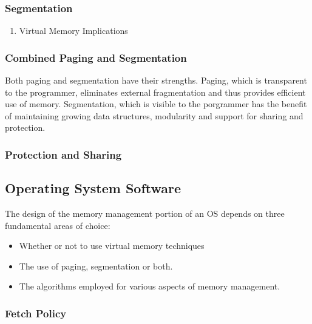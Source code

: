 \documentclass[11pt]{article}
\begin{document}
\subsubsection{Segmentation}
\label{sec:orgheadline35}

\begin{enumerate}
\item Virtual Memory Implications
\label{sec:orgheadline34}
\end{enumerate}

\subsubsection{Combined Paging and Segmentation}
\label{sec:orgheadline36}

Both paging and segmentation have their strengths. Paging, 
which is transparent to the programmer, eliminates external 
fragmentation and thus provides efficient use of memory. Segmentation,
which is visible to the porgrammer has the benefit of maintaining
growing data structures, modularity and support for sharing and 
protection.

\subsubsection{Protection and Sharing}
\label{sec:orgheadline37}

\subsection{Operating System Software}
\label{sec:orgheadline71}

The design of the memory management portion of an OS depends on three
fundamental areas of choice:

\begin{itemize}
\item Whether or not to use virtual memory techniques
\item The use of paging, segmentation or both.
\item The algorithms employed for various aspects of memory management.
\end{itemize}

\subsubsection{Fetch Policy}
\label{sec:orgheadline41}
\end{document}
